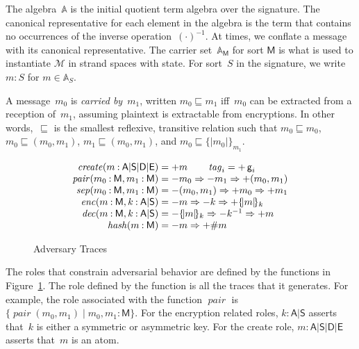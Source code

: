 \documentclass[12pt]{article}
\newcommand{\cn}[1]{\ensuremath{\operatorname{\mathsf{#1}}}}
\newcommand{\fn}[1]{\ensuremath{\operatorname{\mathit{#1}}}}
\newcommand{\srt}[1]{\ensuremath{\mathsf{#1}}}
\newcommand{\typ}{\mathbin:}
\newcommand{\enc}[2]{\ensuremath{\{\!|#1|\!\}_{#2}}}
\newcommand{\invk}[1]{{#1}^{-1}}
\newcommand{\tg}[1]{\cn{g}_{#1}}
\newcommand{\inbnd}{\mathord -}
\newcommand{\outbnd}{\mathord +}
\newcommand{\alg}{\ensuremath{\mathbb{A}}}
\newcommand{\msg}{\ensuremath{\mathcal{M}}}
\newcommand{\ssp}{\ensuremath{\mathcal{S}}}
\newcommand{\bun}{\ensuremath{\mathcal{B}}}
\newcommand{\strands}{\ensuremath{\mathcal{Z}}}
\newcommand{\nodes}{\ensuremath{\mathcal{N}}}
\newcommand{\key}{\srt{A}|\srt{S}}
\newcommand{\base}{\key|\srt{D}|\srt{E}}
\begin{document}
The algebra~{\alg} is the initial quotient term algebra over the
signature.  The canonical representative for each element in the
algebra is the term that contains no occurrences of the inverse
operation~$\invk{(\cdot)}$.  At times, we conflate a message with its
canonical representative.  The carrier set~$\alg_\srt{M}$ for sort
\srt{M} is what is used to instantiate {\msg} in strand spaces with state.
For sort~$S$ in the signature, we write $m\typ S$ for $m\in\alg_S$.

A message~$m_0$ is \emph{carried by}~$m_1$, written $m_0\sqsubseteq
m_1$ iff~$m_0$ can be extracted from a reception of~$m_1$, assuming
plaintext is extractable from encryptions.  In other
words,~$\sqsubseteq$ is the smallest reflexive, transitive relation
such that $m_0\sqsubseteq m_0$, $m_0\sqsubseteq (m_0, m_1)$,
$m_1\sqsubseteq (m_0, m_1)$, and $m_0\sqsubseteq\enc{m_0}{m_1}$.

\begin{figure}
$$\begin{array}{r@{{}={}}l}
\fn{create}(m\typ\base)&\outbnd m\qquad\fn{tag}_i=\outbnd\tg{i}\\
\fn{pair}(m_0\typ\srt{M}, m_1\typ\srt{M})&
\inbnd m_0\Rightarrow\inbnd m_1\Rightarrow\outbnd (m_0,m_1)\\
\fn{sep}(m_0\typ\srt{M}, m_1\typ\srt{M})&
\inbnd (m_0, m_1)\Rightarrow\outbnd m_0\Rightarrow\outbnd m_1\\
\fn{enc}(m\typ\srt{M}, k\typ\srt{A}|\srt{S})&
\inbnd m\Rightarrow\inbnd k\Rightarrow\outbnd \enc{m}{k}\\
\fn{dec}(m\typ\srt{M}, k\typ\key)&
\inbnd \enc{m}{k}\Rightarrow\inbnd\invk{k}\Rightarrow\outbnd m\\
\fn{hash}(m\typ\srt{M})&
\inbnd m\Rightarrow\outbnd \#m
\end{array}$$
\caption{Adversary Traces}\label{fig:adversary}
\end{figure}

The roles that constrain adversarial behavior are defined by the
functions in Figure~\ref{fig:adversary}.  The role defined by the
function is all the traces that it generates.  For example, the role
associated with the function \fn{pair} is $\{\fn{pair}(m_0,m_1)\mid
m_0,m_1\typ\srt{M}\}$.  For the encryption related roles, $k\typ\key$
asserts that~$k$ is either a symmetric or asymmetric key.  For the
create role, $m\typ\base$ asserts that~$m$ is an atom.
\end{document}
